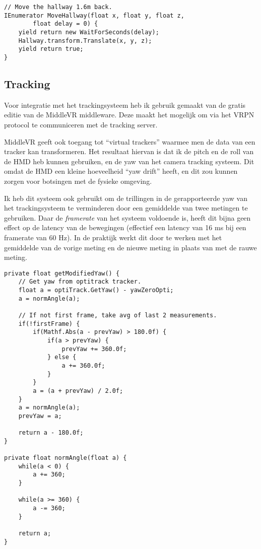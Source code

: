 \begin{verbatim}
// Move the hallway 1.6m back.
IEnumerator MoveHallway(float x, float y, float z, 
        float delay = 0) {
    yield return new WaitForSeconds(delay);
    Hallway.transform.Translate(x, y, z);
    yield return true;
}
\end{verbatim}

\subsection{Tracking}
Voor integratie met het trackingsysteem heb ik gebruik gemaakt van de gratis
editie van de MiddleVR middleware\cite{middlevr}. Deze maakt het mogelijk om via 
het VRPN protocol te communiceren met de tracking server.

MiddleVR geeft ook toegang tot ``virtual trackers'' waarmee men de data van een
tracker kan transformeren. Het resultaat hiervan is dat ik de pitch en de roll
van de HMD heb kunnen gebruiken, en de yaw van het camera tracking systeem. Dit
omdat de HMD een kleine hoeveelheid ``yaw drift'' heeft, en dit zou kunnen zorgen
voor botsingen met de fysieke omgeving.

Ik heb dit systeem ook gebruikt om de trillingen in de gerapporteerde yaw van het
trackingsysteem te verminderen door een gemiddelde van twee metingen te 
gebruiken. Daar de \emph{framerate} van het systeem voldoende is, heeft dit bijna 
geen effect op de latency van de bewegingen (effectief een latency van 16 ms bij
een framerate van 60 Hz). In de praktijk werkt dit door te werken met het 
gemiddelde van de vorige meting en de nieuwe meting in plaats van met de rauwe 
meting.

\begin{verbatim}
private float getModifiedYaw() {
    // Get yaw from optitrack tracker.
    float a = optiTrack.GetYaw() - yawZeroOpti;
    a = normAngle(a);

    // If not first frame, take avg of last 2 measurements.
    if(!firstFrame) {
        if(Mathf.Abs(a - prevYaw) > 180.0f) {
            if(a > prevYaw) {
                prevYaw += 360.0f;
            } else {
                a += 360.0f;
            }
        }
        a = (a + prevYaw) / 2.0f;
    }
    a = normAngle(a);
    prevYaw = a;

    return a - 180.0f;
}

private float normAngle(float a) {
    while(a < 0) {
        a += 360;
    }

    while(a >= 360) {
        a -= 360;
    }

    return a;
}
\end{verbatim}

